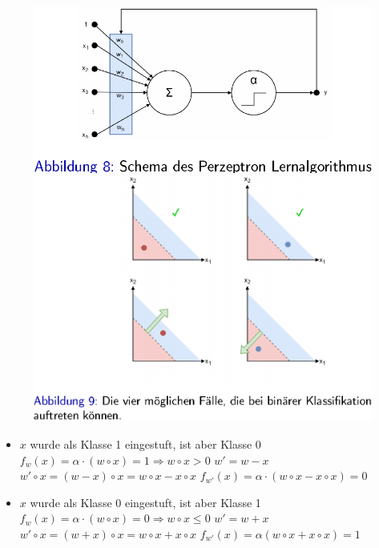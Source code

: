 \documentclass{report}
\begin{document}
\begin{figure}[H]
  \centering
  \begin{minipage}[b]{0.4\textwidth}
    \includegraphics[scale=.25]{ml04_7}
  \end{minipage}
  \hfill
  \begin{minipage}[b]{0.4\textwidth}
    \includegraphics[scale=.25]{ml04_8}
  \end{minipage}
\end{figure}

\vspace*{-1.25em}
\begin{itemize}
  \item $x$ wurde als Klasse 1 eingestuft, ist aber Klasse 0
  \subitem $f_w(x) = \alpha \cdot (w\circ x) = 1 \Rightarrow w\circ x > 0$
  \subitem $w' = w - x$
  \subitem $w'\circ x = (w - x)\circ x = w\circ x - x \circ x$
  \subitem $f_{w'}(x) = \alpha \cdot (w\circ x - x \circ x) = 0$
  \item $x$ wurde als Klasse 0 eingestuft, ist aber Klasse 1
  \subitem $f_w(x) = \alpha \cdot (w\circ x) = 0 \Rightarrow w\circ x \leq 0$
  \subitem $w' = w + x$
  \subitem $w'\circ x = (w + x)\circ x = w\circ x + x\circ x$
  \subitem $f_{w'}(x) = \alpha(w\circ x + x\circ x) = 1$
\end{itemize}
\end{document}

